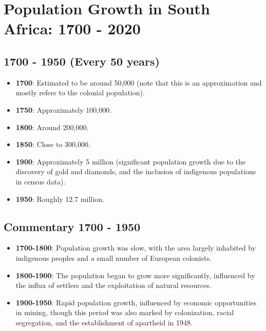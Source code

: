 \section*{Population Growth in South Africa: 1700 - 2020}

\subsection*{1700 - 1950 (Every 50 years)}
\begin{itemize}
    \item \textbf{1700}: Estimated to be around 50,000 (note that this is an approximation and mostly refers to the colonial population).
    \item \textbf{1750}: Approximately 100,000.
    \item \textbf{1800}: Around 200,000.
    \item \textbf{1850}: Close to 300,000.
    \item \textbf{1900}: Approximately 5 million (significant population growth due to the discovery of gold and diamonds, and the inclusion of indigenous populations in census data).
    \item \textbf{1950}: Roughly 12.7 million.
\end{itemize}

\subsection*{Commentary 1700 - 1950}
\begin{itemize}
    \item \textbf{1700-1800}: Population growth was slow, with the area largely inhabited by indigenous peoples and a small number of European colonists.
    \item \textbf{1800-1900}: The population began to grow more significantly, influenced by the influx of settlers and the exploitation of natural resources.
    \item \textbf{1900-1950}: Rapid population growth, influenced by economic opportunities in mining, though this period was also marked by colonization, racial segregation, and the establishment of apartheid in 1948.
\end{itemize}

